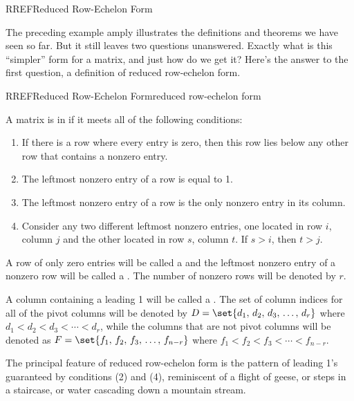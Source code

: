 %
\begin{subsect}{RREF}{Reduced Row-Echelon Form}
%
\begin{para}The preceding example amply illustrates the definitions and theorems we have seen so far.  But it still leaves two questions unanswered.  Exactly what is this ``simpler'' form for a matrix, and just how do we get it?  Here's the answer to the first question, a definition of reduced row-echelon form.\end{para}
%
\begin{definition}{RREF}{Reduced Row-Echelon Form}{reduced row-echelon form}
\begin{para}A matrix is in  if it meets all of the following conditions:
\begin{enumerate}
\item If there is a row where every entry is zero, then this row lies below any other row that contains a nonzero entry.
\item The leftmost nonzero entry of a row is equal to 1.
\item The leftmost nonzero entry of a row is the only nonzero entry in its column.
\item Consider any two different leftmost nonzero entries, one located in row $i$, column $j$ and the other located in row $s$, column $t$.  If $s>i$, then $t>j$.
\end{enumerate}
A row of only zero entries will be called a  and the leftmost nonzero entry of a nonzero row will be called a .  The number of nonzero rows will be denoted by $r$.\end{para}
%
\begin{para}A column containing a leading 1 will be called a .  The set of column indices for all of the pivot columns will be denoted by $D=\set{d_1,\,d_2,\,d_3,\,\ldots,\,d_r}$ where
$d_1<d_2<d_3<\cdots<d_r$,
while the columns that are not pivot columns will be denoted as $F=\set{f_1,\,f_2,\,f_3,\,\ldots,\,f_{n-r}}$ where
$f_1<f_2<f_3<\cdots<f_{n-r}$.
\end{para}
\end{definition}
%
\begin{para}The principal feature of reduced row-echelon form is the pattern of leading 1's guaranteed by conditions (2) and (4), reminiscent of a flight of geese, or steps in a staircase, or water cascading down a mountain stream.\end{para}

\end{subsect}
